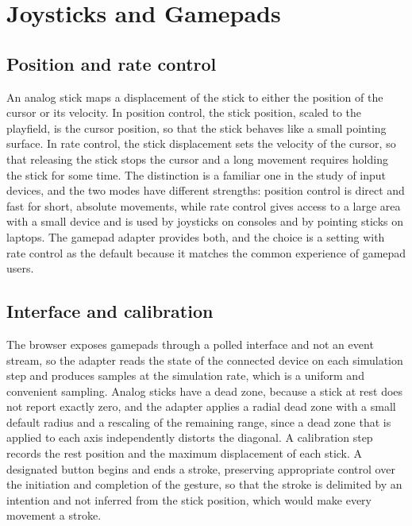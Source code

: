 \chapter{Joysticks and Gamepads}\label{ch:gamepads}

\section{Position and rate control}

An analog stick maps a displacement of the stick to either the position of the cursor or its velocity. In position control, the stick position, scaled to the playfield, is the cursor position, so that the stick behaves like a small pointing surface. In rate control, the stick displacement sets the velocity of the cursor, so that releasing the stick stops the cursor and a long movement requires holding the stick for some time. The distinction is a familiar one in the study of input devices, and the two modes have different strengths: position control is direct and fast for short, absolute movements, while rate control gives access to a large area with a small device and is used by joysticks on consoles and by pointing sticks on laptops.\evD{} The gamepad adapter provides both, and the choice is a setting with rate control as the default because it matches the common experience of gamepad users.

\section{Interface and calibration}

The browser exposes gamepads through a polled interface and not an event stream, so the adapter reads the state of the connected device on each simulation step and produces samples at the simulation rate, which is a uniform and convenient sampling.\evD{} Analog sticks have a dead zone, because a stick at rest does not report exactly zero, and the adapter applies a radial dead zone with a small default radius and a rescaling of the remaining range, since a dead zone that is applied to each axis independently distorts the diagonal. A calibration step records the rest position and the maximum displacement of each stick. A designated button begins and ends a stroke, preserving appropriate control over the initiation and completion of the gesture, so that the stroke is delimited by an intention and not inferred from the stick position, which would make every movement a stroke.

